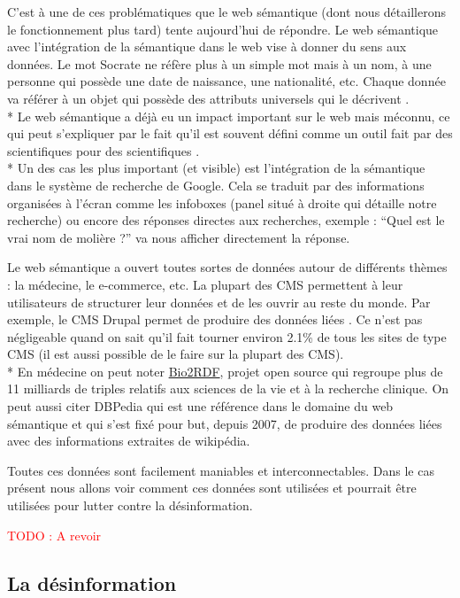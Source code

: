 \documentclass[12pt]{article}
\newcommand\todo[1]{\textcolor{red}{TODO : #1}}
\begin{document}
C'est à une de ces problématiques que le web sémantique (dont nous détaillerons le fonctionnement plus tard) tente aujourd'hui de répondre. Le web sémantique avec l'intégration de la sémantique dans le web vise à donner du sens aux données. Le mot Socrate ne réfère plus à un simple mot mais à un nom, à une personne qui possède une date de naissance, une nationalité, etc. Chaque donnée va référer à un objet qui possède des attributs universels qui le décrivent \cite{schemaPerson}.
\\*
Le web sémantique a déjà eu un impact important sur le web mais méconnu, ce qui peut s'expliquer par le fait qu'il est souvent défini comme un outil fait par des scientifiques pour des scientifiques \cite{semantic_web_has_failed}.
\\*
Un des cas les plus important (et visible) est l'intégration de la sémantique dans le système de recherche de Google. Cela se traduit par des informations organisées à l'écran comme les infoboxes (panel situé à droite qui détaille notre recherche) ou encore des réponses directes aux recherches, exemple : \enquote{Quel est le vrai nom de molière ?} va nous afficher directement la réponse.

Le web sémantique a ouvert toutes sortes de données autour de différents thèmes : la médecine, le e-commerce, etc. La plupart des CMS permettent à leur utilisateurs de structurer leur données et de les ouvrir au reste du monde. Par exemple, le CMS Drupal permet de produire des données liées \cite{corlosquet2009produce}. Ce n'est pas négligeable quand on sait qu'il fait tourner environ 2.1\% de tous les sites de type CMS \cite{w3techs} (il est aussi possible de le faire sur la plupart des CMS). 
\\*
En médecine on peut noter \href{http://bio2rdf.org/}{Bio2RDF}, projet open source qui regroupe plus de 11 milliards de triples relatifs aux sciences de la vie et à la recherche clinique. On peut aussi citer DBPedia qui est une référence dans le domaine du web sémantique et qui s'est fixé pour but, depuis 2007, de produire des données liées avec des informations extraites de wikipédia.

Toutes ces données sont facilement maniables et interconnectables. Dans le cas présent nous allons voir comment ces données sont utilisées et pourrait être utilisées pour lutter contre la désinformation.

\todo{A revoir}

\subsection{La désinformation}
\end{document}
